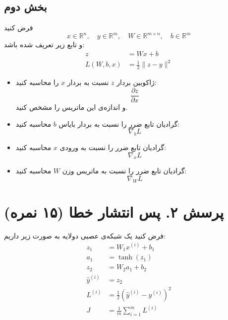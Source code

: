 \subsection*{بخش دوم}

فرض کنید
\begin{equation*}
    x \in \mathbb{R}^n, \quad y \in \mathbb{R}^m, \quad W \in \mathbb{R}^{m \times n}, \quad b \in \mathbb{R}^m
\end{equation*}
و تابع زیر تعریف شده باشد:
\begin{align*}
    z &= Wx + b \\
    L(W, b, x) &= \frac{1}{2}\|z - y\|^2
\end{align*}

\begin{itemize}
    \item[آ)] ژاکوبین بردار $z$ نسبت به بردار $x$ را محاسبه کنید:
    \begin{equation*}
        \frac{\partial z}{\partial x}
    \end{equation*}
    و اندازه‌ی این ماتریس را مشخص کنید.
    \item[ب)] گرادیان تابع ضرر را نسبت به بردار بایاس $b$ محاسبه کنید:
    \begin{equation*}
        \nabla_b L
    \end{equation*}
    \item[ج)] گرادیان تابع ضرر را نسبت به ورودی $x$ محاسبه کنید:
    \begin{equation*}
        \nabla_x L
    \end{equation*}
    \item[د)] گرادیان تابع ضرر را نسبت به ماتریس وزن $W$ محاسبه کنید:
    \begin{equation*}
        \nabla_W L
    \end{equation*}
\end{itemize}

\section*{پرسش ۲. پس انتشار خطا (۱۵ نمره)}

فرض کنید یک شبکه‌ی عصبی دولایه به صورت زیر داریم:
\begin{align*}
    z_1 &= W_1 x^{(i)} + b_1 \\
    a_1 &= \tanh(z_1) \\
    z_2 &= W_2 a_1 + b_2 \\
    \hat{y}^{(i)} &= z_2 \\
    L^{(i)} &= \frac{1}{2} (\hat{y}^{(i)} - y^{(i)})^2 \\
    J &= \frac{1}{m} \sum_{i=1}^m L^{(i)}
\end{align*}

